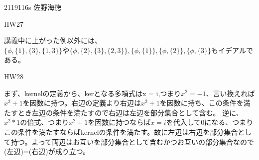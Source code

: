 \documentclass[11pt]{jsarticle}
\begin{document}
2119116s 佐野海徳
\par HW27
\par 講義中に上がった例以外には、$\{\phi,\{1\},\{3\},\{1,3\}\}や\{\phi,\{2\},\{3\},\{2,3\}\},\{\phi,\{1\}\}, \{\phi,\{2\}\},\{\phi ,\{3\}\}$もイデアルである。
\par HW28
\par まず、kernelの定義から、kerとなる多項式はx = i,つまり$x^2 = -1$、言い換えれば$x^2 + 1$を因数に持つ。右辺の定義より右辺は$x^2 + 1$を因数に持ち、この条件を満たすとき左辺の条件を満たすので右辺は左辺を部分集合として含む。
    逆に、$x^2*1$の倍式、つまり$x^2+1$を因数に持つならば$x=i$を代入して0になる、つまりこの条件を満たすならばkernelの条件を満たす。故に左辺は右辺を部分集合として持つ。よって両辺はお互いを部分集合として含むかつお互いの部分集合なので
(左辺)=(右辺)が成り立つ。
\end{document}
